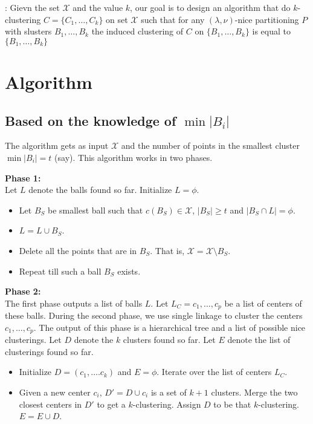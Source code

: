 \documentclass[11pt]{article}
\begin{document}
: Gievn the set $\mathcal{X}$ and the value $k$, our goal is to design an algorithm that do $k$-clustering $C=\{C_1,\ldots,C_k\}$ on set $\mathcal{X}$ such that  for any $(\lambda,\nu)$-nice partitioning $P$ with slusters $B_1,\ldots,B_k$ the induced clustering of $C$ on $\{B_1,\ldots,B_k\}$ is equal to $\{B_1,\ldots,B_k\}$



\section{Algorithm}

\subsection{Based on the knowledge of $\min |B_i|$}


The algorithm gets as input $\mathcal{X}$ and the number of points in the smallest cluster $\min |B_i| = t$ (say). This algorithm works in two phases.

\noindent \textbf{Phase 1:}\\ Let $L$ denote the balls found so far. Initialize $L = \phi$.
\begin{itemize}
\item Let $B_S$ be smallest ball such that $c(B_S) \in \mathcal{X}$, $|B_S| \ge t$  and $|B_S \cap L | = \phi$.
\item $L = L \cup B_S$.
\item Delete all the points that are in $B_S$. That is, $\mathcal{X} = \mathcal{X}\setminus B_S$.
\item Repeat till such a ball $B_S$ exists.
\end{itemize}

\noindent \textbf{Phase 2:}\\ The first phase outputs a list of balls $L$. Let $L_C = c_1,\ldots,c_p$ be a list of centers of these balls. During the second phase, we use single linkage to cluster the centers $c_1,\ldots,c_p$. The output of this phase is a hierarchical tree and a list of possible nice clusterings. Let $D$ denote the $k$ clusters found so far. Let $E$ denote the list of clusterings found so far.
\begin{itemize}
\item Initialize $D = (c_1,\ldots.c_k)$ and $E = \phi$. Iterate over the list of centers $L_C$.
\item Given a new center $c_i$, $D' = D \cup c_i$ is a set of $k+1$ clusters. Merge the two closest centers in $D'$ to get a $k$-clustering. Assign $D$ to be that $k$-clustering. $E = E \cup D$.
\end{itemize}
\end{document}
